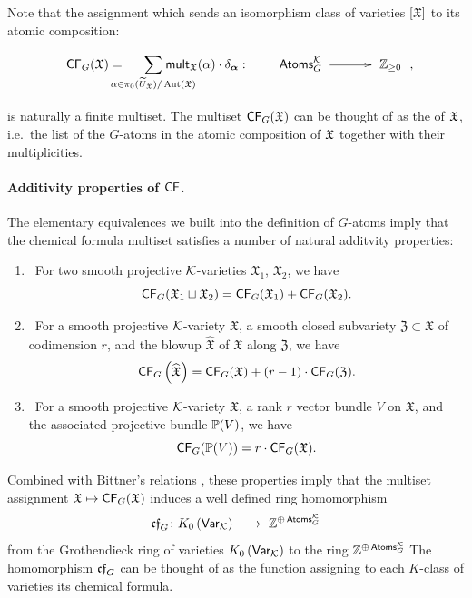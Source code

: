 \documentclass[twoside,leqno]{article}
\numberwithin{equation}{section}
\theoremstyle{plain}
\theoremstyle{definition}
\begin{document}
\medskip


Note that the 
assignment
which sends an isomorphism class of varieties $[\mathfrak X]$ to its atomic composition:
\[
\xymatrix@C+0.7pc@M+0.3pc{ 
\CF_{G}(\mathfrak{X}) = {\displaystyle \hspace{-1pc} \sum_{\alpha \in \pi_{0}(\tU_{\fX})/\op{Aut}(\mathfrak{X})}} \hspace{-2pc}  \mathsf{mult}_{\mathfrak{X}}(\alpha)
 \cdot \delta_{\balpha}\, \colon \, \hspace{-2pc} & 
\mathsf{Atoms}_{G}^{\kay} \ar[r] & \bbZ_{\geq 0}},
\]
is naturally a finite  multiset. The multiset $\mathsf{CF}_{G}(\mathfrak{X})$ can be thought of as the  of $\mathfrak X$, i.e.\ the list of the $G$-atoms in the atomic composition of $\mathfrak X$ together with their multiplicities.


\paragraph{Additivity properties of \texorpdfstring{$\mathsf{CF}$}{CF}.} \label{par:CF}
The elementary equivalences we built into the definition of $G$-atoms imply that the chemical formula multiset satisfies a number of natural additvity properties:
\begin{enumerate}[wide]
\item[{\bfseries (1)}] \, For two smooth projective $\mathcal K$-varieties $\mathfrak{X}_1$, $\mathfrak{X}_2$, we have
    \[ \mathsf{CF}_G(\mathfrak{X}_1 \sqcup \mathfrak{X}_2) = \mathsf{CF}_{G}(\mathfrak{X}_1) + \mathsf{CF}_{G}(\mathfrak{X}_2). \]
\item[{\bfseries (2)}] \,  For a smooth projective $\mathcal K$-variety $\mathfrak{X}$, a smooth closed subvariety $\mathfrak{Z} \subset \mathfrak{X}$ of codimension $r$, and the blowup $\widehat{\mathfrak{X}}$ of $\mathfrak{X}$ along $\mathfrak{Z}$, we have
    \[ \mathsf{CF}_{G}\left(\widehat{\mathfrak{X}}\right) = \mathsf{CF}_{G}(\mathfrak{X}) + (r-1)\cdot 
    \mathsf{CF}_{G}(\mathfrak{Z}). \]
\item[{\bfseries (3)}] \, For a smooth projective $\mathcal K$-variety $\mathfrak{X}$, a rank $r$ vector bundle $V$ on $\mathfrak{X}$, and the associated projective bundle $\mathbb P(V)$, we have
    \[ \mathsf{CF}_{G}(\mathbb P(V)) = r \cdot \mathsf{CF}_{G}(\mathfrak{X}) .\]
\end{enumerate}    

\medskip

Combined with Bittner's  relations \cite{Bittner}, these properties imply  that the multiset 
assignment $\mathfrak X \mapsto \mathsf{CF}_{G}(\mathfrak{X})$
induces a well defined ring 
homomorphism 
\[
\mathfrak{cf}_{G} \colon K_0\left(\mathsf{Var}_{\mathcal K}\right) \ \longrightarrow  \ \mathbb Z^{\oplus \, \mathsf{Atoms}^{\mathcal K}_{G}}
\]
from the Grothendieck ring of varieties $K_0\left(\mathsf{Var}_{\mathcal K}\right)$ to the ring 
$\mathbb Z^{\oplus \, \mathsf{Atoms}^{\mathcal K}_{G}}$
The homomorphism $\mathfrak{cf}_{G}$ can be thought of as the function assigning to each $K$-class of varieties its chemical formula.
\end{document}
